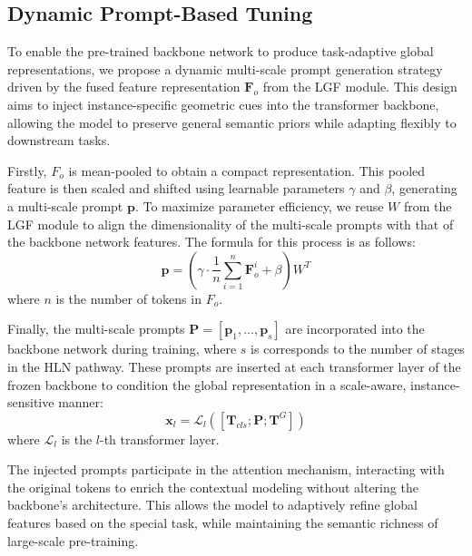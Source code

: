 
\subsection{Dynamic Prompt-Based Tuning}
\label{sec:FT_backbone}
To enable the pre-trained backbone network to produce task-adaptive global representations, we propose a dynamic multi-scale prompt generation strategy driven by the fused feature representation $\mathbf{F}_{o}$ from the LGF module. This design aims to inject instance-specific geometric cues into the transformer backbone, allowing the model to preserve general semantic priors while adapting flexibly to downstream tasks.

Firstly, $F_{o}$ is mean-pooled to obtain a compact representation. This pooled feature is then scaled and shifted using learnable parameters $\gamma$ and $\beta$, generating a multi-scale prompt $\mathbf{p}$. To maximize parameter efficiency, we reuse $W$ from the LGF module to align the dimensionality of the multi-scale prompts with that of the backbone network features. The formula for this process is as follows:
\begin{equation}
	\mathbf{p} = \left(\gamma \cdot \frac{1}{n} \sum_{i=1}^{n} \mathbf{F}_o^i + \beta \right) W^T
\end{equation}
where $n$ is the number of tokens in $F_o$.

Finally, the multi-scale prompts $\mathbf{P}=[\mathbf{p}_{1}, \ldots, \mathbf{p}_{s}]$ are incorporated into the backbone network during training, where $s$ is corresponds to the number of stages in the HLN pathway. These prompts are inserted at each transformer layer of the frozen backbone to condition the global representation in a scale-aware, instance-sensitive manner:
\begin{equation}
	\mathbf{x}_l = \mathcal{L}_l\left([\mathbf{T}_{cls}; \mathbf{P}; \mathbf{T}^{G}]\right)
\end{equation}
where $\mathcal{L}_l$ is the $l$-th transformer layer. 

The injected prompts participate in the attention mechanism, interacting with the original tokens to enrich the contextual modeling without altering the backbone’s architecture. This allows the model to adaptively refine global features based on the special task, while maintaining the semantic richness of large-scale pre-training.

